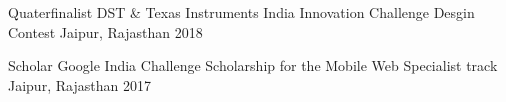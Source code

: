 



\begin{cvhonors}

    \cvhonor
    {Quaterfinalist} %
    {DST \& Texas Instruments India Innovation Challenge Desgin Contest} %
    {Jaipur, Rajasthan} %
    {2018} %
    
  \cvhonor
    {Scholar} %
    {Google India Challenge Scholarship for the Mobile Web Specialist track} %
    {Jaipur, Rajasthan} %
    {2017} %



\end{cvhonors}








